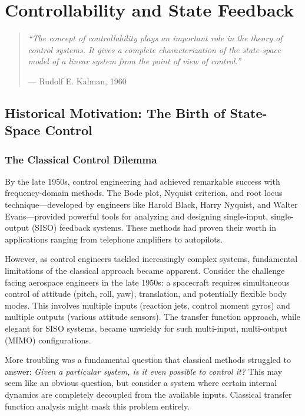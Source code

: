 
\chapter{Controllability and State Feedback}

\begin{quote}
\textit{``The concept of controllability plays an important role in the theory of control systems. It gives a complete characterization of the state-space model of a linear system from the point of view of control.''}
\begin{flushright}
--- Rudolf E. Kalman, 1960
\end{flushright}
\end{quote}

\section{Historical Motivation: The Birth of State-Space Control}

\subsection{The Classical Control Dilemma}

By the late 1950s, control engineering had achieved remarkable success with frequency-domain methods. The Bode plot, Nyquist criterion, and root locus technique---developed by engineers like Harold Black, Harry Nyquist, and Walter Evans---provided powerful tools for analyzing and designing single-input, single-output (SISO) feedback systems. These methods had proven their worth in applications ranging from telephone amplifiers to autopilots.

However, as control engineers tackled increasingly complex systems, fundamental limitations of the classical approach became apparent. Consider the challenge facing aerospace engineers in the late 1950s: a spacecraft requires simultaneous control of attitude (pitch, roll, yaw), translation, and potentially flexible body modes. This involves multiple inputs (reaction jets, control moment gyros) and multiple outputs (various attitude sensors). The transfer function approach, while elegant for SISO systems, became unwieldy for such multi-input, multi-output (MIMO) configurations.

More troubling was a fundamental question that classical methods struggled to answer: \textit{Given a particular system, is it even possible to control it?} This may seem like an obvious question, but consider a system where certain internal dynamics are completely decoupled from the available inputs. Classical transfer function analysis might mask this problem entirely.

